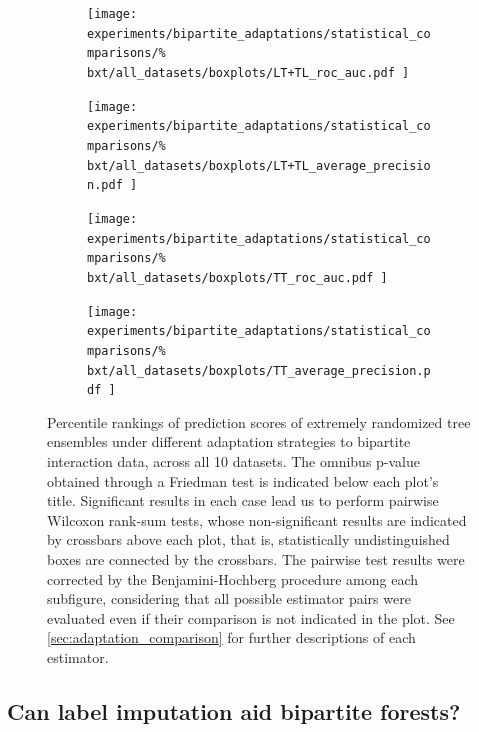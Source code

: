 \begin{figure}[tbh]
    \centering
    \begin{subfigure}{0.49\textwidth}
        \texttt{[image: 
            experiments/bipartite\_adaptations/statistical\_comparisons/\%
            bxt/all\_datasets/boxplots/LT+TL\_roc\_auc.pdf
        ]}
    \end{subfigure}
    \begin{subfigure}{0.49\textwidth}
        \texttt{[image: 
            experiments/bipartite\_adaptations/statistical\_comparisons/\%
            bxt/all\_datasets/boxplots/LT+TL\_average\_precision.pdf
        ]}
    \end{subfigure}

    \begin{subfigure}{0.49\textwidth}
        \texttt{[image: 
            experiments/bipartite\_adaptations/statistical\_comparisons/\%
            bxt/all\_datasets/boxplots/TT\_roc\_auc.pdf
        ]}
    \end{subfigure}
    \begin{subfigure}{0.49\textwidth}
        \texttt{[image: 
            experiments/bipartite\_adaptations/statistical\_comparisons/\%
            bxt/all\_datasets/boxplots/TT\_average\_precision.pdf
        ]}
    \end{subfigure}
    \caption{
        Percentile rankings of prediction scores of extremely randomized tree ensembles under different adaptation strategies to bipartite interaction data, across all 10 datasets.
        The omnibus p-value obtained through a Friedman test is indicated below each plot's title. Significant results in each case lead us to perform pairwise Wilcoxon rank-sum tests, whose non-significant results are indicated by crossbars above each plot, that is, statistically undistinguished boxes are connected by the crossbars. The pairwise test results were corrected by the Benjamini-Hochberg procedure among each subfigure, considering that all possible estimator pairs were evaluated even if their comparison is not indicated in the plot. See \autoref{sec:adaptation_comparison} for further descriptions of each estimator.
    }
    \label{fig:adaptations_bxt}
\end{figure}


\subsection{Can label imputation aid bipartite forests?}
\label{sec:y_reconstruction}

